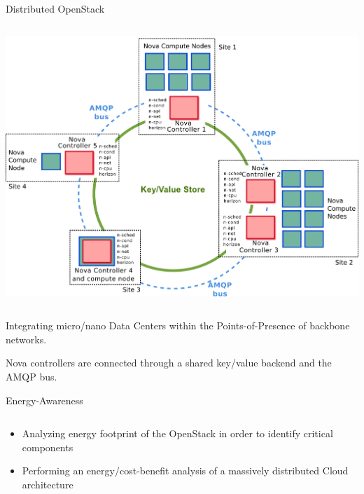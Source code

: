 \documentclass[final,t]{beamer}
\begin{document}
\begin{frame}[fragile]{}
\begin{columns}[t]
\begin{column}{.49\linewidth}
\begin{block}{\Large Distributed OpenStack}
\begin{columns}[T]
\begin{column}{0.95\linewidth}
           \centering
           \includegraphics[width=1.\linewidth]{images/OpenStack_distributed.pdf}

          \end{column}
        \end{columns}

        \vspace{0.3cm}

        {\Large Integrating micro/nano Data Centers within the Points-of-Presence of backbone networks.}

        \vspace{0.3cm}

        {\Large Nova controllers are connected through a shared key/value backend and the AMQP bus.}
      \end{block}


      \begin{block}{\Large Energy-Awareness}
        \begin{columns}[T]
          \begin{column}{0.95\linewidth}
          \begin{itemize}
          \item {\Large Analyzing energy footprint of the OpenStack in order to identify critical components} 
          \item {\Large Performing an energy/cost-benefit analysis of a massively distributed Cloud architecture }
          \end{itemize}
          \end{column}
        \end{columns}
      \end{block}


\end{column}
\end{columns}
\end{frame}
\end{document}
